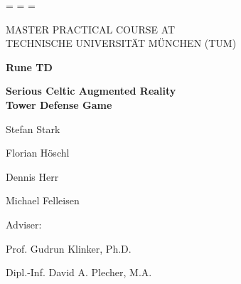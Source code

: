 \documentclass[headsepline,footsepline,footinclude=false,oneside,fontsize=11pt,paper=a4,listof=totoc,bibliography=totoc]{scrbook}
\begin{document}
\begin{titlepage}
  \oddsidemargin=\evensidemargin\relax
  \textwidth=\dimexpr{}\evensidemargin-2in\relax
  \hsize=\textwidth\relax

  \centering

  {\Large\MakeUppercase {Master Practical Course at}} \\
  {\Large\MakeUppercase {Technische Universität München (TUM)}}

  \vspace{35mm}
  {\Huge\bfseries Rune TD}
  
  \vspace{10mm}
  {\LARGE\bfseries Serious Celtic Augmented Reality} \\
  {\LARGE\bfseries Tower Defense Game}

  \vspace{30mm}
  {\LARGE Stefan Stark}
  
  \vspace{5mm}
  {\LARGE Florian Höschl}
  
  \vspace{5mm}
  {\LARGE Dennis Herr}
  
  \vspace{5mm}
  {\LARGE Michael Felleisen}
  
  \vspace{20mm}
  {\LARGE Adviser:}
  
  \vspace{5mm}
  {\LARGE Prof. Gudrun Klinker, Ph.D.}
  
  \vspace{5mm}
  {\LARGE Dipl.-Inf. David A. Plecher, M.A.}

  \vspace{20mm}

\end{titlepage}

\frontmatter{}

%


\mainmatter{}


%
%
%





%
%

\appendix{}
%

\end{document}

